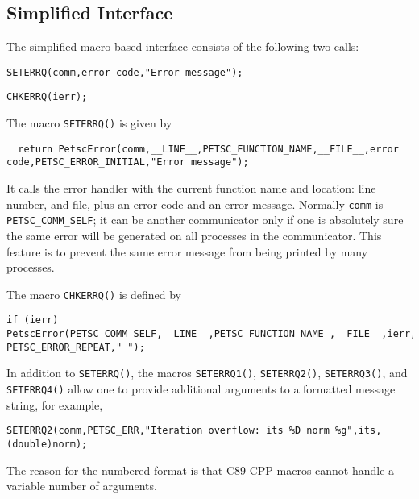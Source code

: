 \subsection{Simplified Interface}

The simplified macro-based interface consists of the following two calls:
\begin{tightitemize}
  \item \lstinline{SETERRQ(comm,error code,"Error message");}
  \item \lstinline{CHKERRQ(ierr);}
\end{tightitemize}

The macro \lstinline{SETERRQ()} is given by
\begin{lstlisting}
  return PetscError(comm,__LINE__,PETSC_FUNCTION_NAME,__FILE__,error code,PETSC_ERROR_INITIAL,"Error message");
\end{lstlisting}
It calls the error handler with the current function name and location: line number,
and file, plus an error code and an error message.
Normally \lstinline{comm} is \lstinline{PETSC_COMM_SELF}; it can be another communicator only if
one is absolutely sure the same error will be generated on all processes in the communicator.
This feature is to prevent the same error message from being printed by many processes.


The macro \lstinline{CHKERRQ()} is defined by
\begin{lstlisting}
if (ierr) PetscError(PETSC_COMM_SELF,__LINE__,PETSC_FUNCTION_NAME_,__FILE__,ierr, PETSC_ERROR_REPEAT," ");
\end{lstlisting}

In addition to \lstinline{SETERRQ()}, the macros \lstinline{SETERRQ1()}, \lstinline{SETERRQ2()}, \lstinline{SETERRQ3()},
and \lstinline{SETERRQ4()}  allow one to provide additional arguments to a formatted message string, for example,
\begin{lstlisting}
SETERRQ2(comm,PETSC_ERR,"Iteration overflow: its %D norm %g",its,(double)norm);
\end{lstlisting}
The reason for the numbered format is that C89 CPP macros cannot handle a variable number
of arguments.

